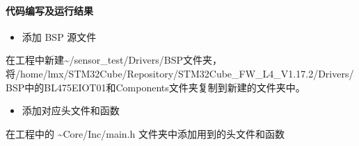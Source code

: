 \documentclass[a4paper,12pt,english]{sphinxmanual}
\begin{document}
\paragraph{代码编写及运行结果}
\label{\detokenize{exp-stm32/peripherals-and-sensors:id12}}\begin{itemize}
\item {} 
\sphinxAtStartPar
添加 BSP 源文件

\end{itemize}

\sphinxAtStartPar
在工程中新建\textasciitilde{}/sensor\_test/Drivers/BSP文件夹，将/home/lmx/STM32Cube/Repository/STM32Cube\_FW\_L4\_V1.17.2/Drivers/BSP中的B\sphinxhyphen{}L475E\sphinxhyphen{}IOT01和Components文件夹复制到新建的文件夹中。
\begin{itemize}
\item {} 
\sphinxAtStartPar
添加对应头文件和函数

\end{itemize}

\sphinxAtStartPar
在工程中的 \textasciitilde{}Core/Inc/main.h 文件夹中添加用到的头文件和函数
\end{document}
